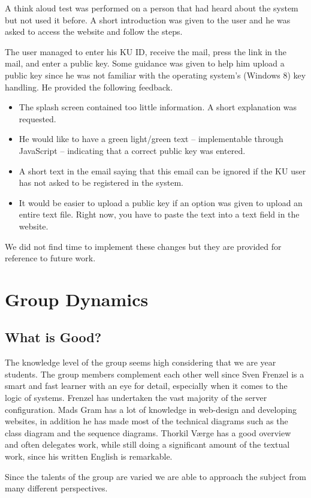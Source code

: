 \documentclass[11pt,a4paper]{report}
\begin{document}
A think aloud test was performed on a person that had heard about the system but not used it before. A short introduction was given to the user and he was asked to access the website and follow the steps.

The user managed to enter his KU ID, receive the mail, press the link in the mail, and enter a public key. Some guidance was given to help him upload a public key since he was not familiar with the operating system's (Windows 8) key handling. He provided the following feedback.
\begin{itemize}
    \item The splash screen contained too little information. A short explanation was requested.
    \item He would like to have a green light/green text -- implementable through JavaScript -- indicating that a correct public key was entered.
    \item A short text in the email saying that this email can be ignored if the KU user has not asked to be registered in the system.
    \item It would be easier to upload a public key if an option was given to upload an entire text file. Right now, you have to paste the text into a text field in the website.
\end{itemize}
We did not find time to implement these changes but they are provided for reference to future work.


\section{Group Dynamics}
\subsection{What is Good?}
The knowledge level of the group seems high considering that we are  year students. The group members complement each other well since Sven Frenzel is a smart and fast learner with an eye for detail, especially when it comes to the logic of systems. Frenzel has undertaken the vast majority of the server configuration. Mads Gram has a lot of knowledge in web-design and developing websites, in addition he has made most of the technical diagrams such as the class diagram and the sequence diagrams. Thorkil Værge has a good overview and often delegates work, while still doing a significant amount of the textual work, since his written English is remarkable.

Since the talents of the group are varied we are able to approach the subject from many different perspectives.
\end{document}
